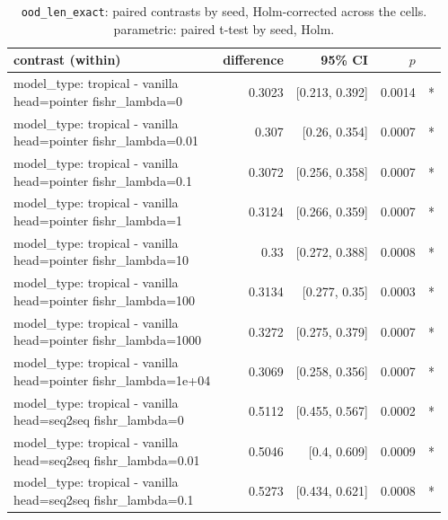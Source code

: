 \documentclass[10pt]{article}
\makeatletter
\newcommand{\stackcell}[1]{\begin{tabular}[t]{@{}l@{}}#1\end{tabular}}
\makeatother
\begin{document}
{\small
\begin{longtable}{lrrrl}
\caption{\texttt{ood\_len\_exact}: paired contrasts by seed, Holm-corrected across the cells. parametric: paired t-test by seed, Holm.}\label{tab:paired-ood_len_exact}\\
\toprule
contrast (within) & difference & 95\% CI & $p$ & \\
\midrule
\endhead
\stackcell{model\_type: tropical - vanilla\\\footnotesize head=pointer fishr\_lambda=0 } & 0.3023 & [0.213, 0.392] & 0.0014 & *\\
\stackcell{model\_type: tropical - vanilla\\\footnotesize head=pointer fishr\_lambda=0.01 } & 0.307 & [0.26, 0.354] & 0.0007 & *\\
\stackcell{model\_type: tropical - vanilla\\\footnotesize head=pointer fishr\_lambda=0.1 } & 0.3072 & [0.256, 0.358] & 0.0007 & *\\
\stackcell{model\_type: tropical - vanilla\\\footnotesize head=pointer fishr\_lambda=1 } & 0.3124 & [0.266, 0.359] & 0.0007 & *\\
\stackcell{model\_type: tropical - vanilla\\\footnotesize head=pointer fishr\_lambda=10 } & 0.33 & [0.272, 0.388] & 0.0008 & *\\
\stackcell{model\_type: tropical - vanilla\\\footnotesize head=pointer fishr\_lambda=100 } & 0.3134 & [0.277, 0.35] & 0.0003 & *\\
\stackcell{model\_type: tropical - vanilla\\\footnotesize head=pointer fishr\_lambda=1000 } & 0.3272 & [0.275, 0.379] & 0.0007 & *\\
\stackcell{model\_type: tropical - vanilla\\\footnotesize head=pointer fishr\_lambda=1e+04 } & 0.3069 & [0.258, 0.356] & 0.0007 & *\\
\stackcell{model\_type: tropical - vanilla\\\footnotesize head=seq2seq fishr\_lambda=0 } & 0.5112 & [0.455, 0.567] & 0.0002 & *\\
\stackcell{model\_type: tropical - vanilla\\\footnotesize head=seq2seq fishr\_lambda=0.01 } & 0.5046 & [0.4, 0.609] & 0.0009 & *\\
\stackcell{model\_type: tropical - vanilla\\\footnotesize head=seq2seq fishr\_lambda=0.1 } & 0.5273 & [0.434, 0.621] & 0.0008 & *\\

\end{longtable}}
\end{document}
